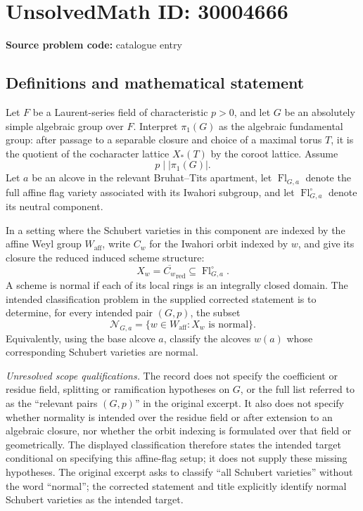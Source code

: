 \documentclass[11pt]{article}
\begin{document}
\section*{UnsolvedMath ID: 30004666}
\textbf{Source problem code:} catalogue entry
\subsection{Definitions and mathematical statement}
Let \(F\) be a Laurent-series field of characteristic \(p>0\), and let \(G\) be an absolutely simple algebraic group over \(F\). Interpret \(\pi_1(G)\) as the algebraic fundamental group: after passage to a separable closure and choice of a maximal torus \(T\), it is the quotient of the cocharacter lattice \(X_*(T)\) by the coroot lattice. Assume
\[
p\mid |\pi_1(G)|.
\]
Let \(a\) be an alcove in the relevant Bruhat--Tits apartment, let \(\operatorname{Fl}_{G,a}\) denote the full affine flag variety associated with its Iwahori subgroup, and let \(\operatorname{Fl}_{G,a}^{\circ}\) denote its neutral component.

In a setting where the Schubert varieties in this component are indexed by the affine Weyl group \(W_{\mathrm{aff}}\), write \(C_w\) for the Iwahori orbit indexed by \(w\), and give its closure the reduced induced scheme structure:
\[
X_w=\overline{C_w}_{\mathrm{red}}\subseteq\operatorname{Fl}_{G,a}^{\circ}.
\]
A scheme is normal if each of its local rings is an integrally closed domain. The intended classification problem in the supplied corrected statement is to determine, for every intended pair \((G,p)\), the subset
\[
\mathcal N_{G,a}
=\{w\in W_{\mathrm{aff}}:X_w\text{ is normal}\}.
\]
Equivalently, using the base alcove \(a\), classify the alcoves \(w(a)\) whose corresponding Schubert varieties are normal.

\textit{Unresolved scope qualifications.} The record does not specify the coefficient or residue field, splitting or ramification hypotheses on \(G\), or the full list referred to as the ``relevant pairs \((G,p)\)'' in the original excerpt. It also does not specify whether normality is intended over the residue field or after extension to an algebraic closure, nor whether the orbit indexing is formulated over that field or geometrically. The displayed classification therefore states the intended target conditional on specifying this affine-flag setup; it does not supply these missing hypotheses. The original excerpt asks to classify ``all Schubert varieties'' without the word ``normal''; the corrected statement and title explicitly identify normal Schubert varieties as the intended target.
\end{document}
